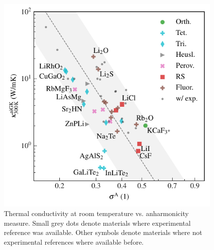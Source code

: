 \begin{figure}
	\includegraphics[width=\textwidth]{./data/plots/kappa_vs_sigma_trusted/kappa_vs_sigma_trusted.pdf}
	\caption{Thermal conductivity at room temperature vs. anharmonicity measure. Small grey dots denote materials where experimental reference was available. Other symbols denote materials where not experimental references where available before.}
	\label{fig:kappa_sigma}
\end{figure}

\newpage

